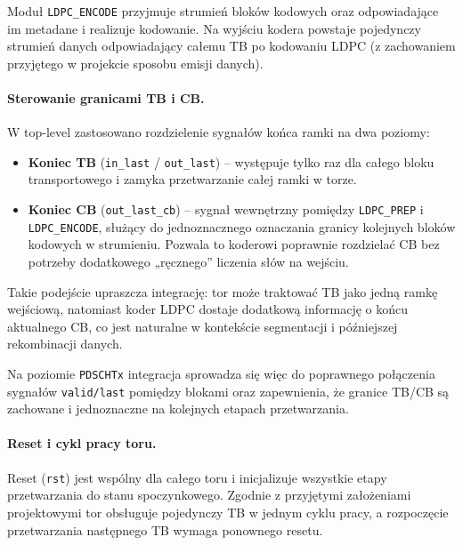 Moduł \texttt{LDPC\_ENCODE} przyjmuje strumień bloków kodowych oraz odpowiadające im metadane i realizuje kodowanie. Na wyjściu kodera powstaje pojedynczy strumień danych odpowiadający całemu TB po kodowaniu LDPC (z zachowaniem przyjętego w projekcie sposobu emisji danych).

\paragraph{Sterowanie granicami TB i CB.}
W top-level zastosowano rozdzielenie sygnałów końca ramki na dwa poziomy:
\begin{itemize}
  \item \textbf{Koniec TB} (\texttt{in\_last} / \texttt{out\_last}) -- występuje tylko raz dla całego bloku transportowego i zamyka przetwarzanie całej ramki w torze.
  \item \textbf{Koniec CB} (\texttt{out\_last\_cb}) -- sygnał wewnętrzny pomiędzy \texttt{LDPC\_PREP} i \texttt{LDPC\_ENCODE}, służący do jednoznacznego oznaczania granicy kolejnych bloków kodowych w strumieniu. Pozwala to koderowi poprawnie rozdzielać CB bez potrzeby dodatkowego „ręcznego” liczenia słów na wejściu.
\end{itemize}

Takie podejście upraszcza integrację: tor może traktować TB jako jedną ramkę wejściową, natomiast koder LDPC dostaje dodatkową informację o końcu aktualnego CB, co jest naturalne w kontekście segmentacji i późniejszej rekombinacji danych.

Na poziomie \texttt{PDSCHTx} integracja sprowadza się więc do poprawnego połączenia sygnałów \texttt{valid/last} pomiędzy blokami oraz zapewnienia, że granice TB/CB są zachowane i jednoznaczne na kolejnych etapach przetwarzania.

\paragraph{Reset i cykl pracy toru.}
Reset (\texttt{rst}) jest wspólny dla całego toru i inicjalizuje wszystkie etapy przetwarzania do stanu spoczynkowego. Zgodnie z przyjętymi założeniami projektowymi tor obsługuje pojedynczy TB w jednym cyklu pracy, a rozpoczęcie przetwarzania następnego TB wymaga ponownego resetu.





















